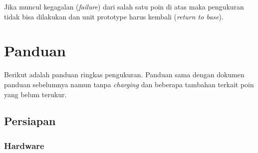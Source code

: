 \documentclass[12pt,]{article}
\begin{document}
	Jika muncul kegagalan (\textit{failure}) dari salah satu poin di atas maka pengukuran tidak bisa dilakukan
	dan unit prototype harus kembali (\textit{return to base}).
	
	\newpage
	\section{Panduan}
	
	Berikut adalah panduan ringkas pengukuran.
	Panduan sama dengan dokumen panduan sebelumnya namun tanpa \textit{charging} dan beberapa tambahan terkait poin yang belum terukur.
	
	\subsection{Persiapan}
	
	\subsubsection{Hardware}
	
\end{document}
